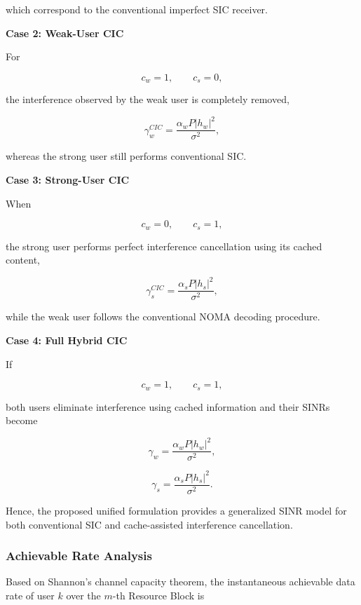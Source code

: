 \documentclass[12pt,a4paper]{article}
\begin{document}
which correspond to the conventional imperfect SIC receiver.

\textbf{Case 2: Weak-User CIC}

For

\[
c_w=1,\qquad c_s=0,
\]

the interference observed by the weak user is completely removed,

\begin{equation}
\gamma_w^{CIC}
=
\frac{\alpha_wP|h_w|^2}
{\sigma^2},
\end{equation}

whereas the strong user still performs conventional SIC.

\textbf{Case 3: Strong-User CIC}

When

\[
c_w=0,\qquad c_s=1,
\]

the strong user performs perfect interference cancellation using its cached content,

\begin{equation}
\gamma_s^{CIC}
=
\frac{\alpha_sP|h_s|^2}
{\sigma^2},
\end{equation}

while the weak user follows the conventional NOMA decoding procedure.

\textbf{Case 4: Full Hybrid CIC}

If

\[
c_w=1,\qquad c_s=1,
\]

both users eliminate interference using cached information and their SINRs become

\begin{equation}
\gamma_w
=
\frac{\alpha_wP|h_w|^2}
{\sigma^2},
\end{equation}

\begin{equation}
\gamma_s
=
\frac{\alpha_sP|h_s|^2}
{\sigma^2}.
\end{equation}

Hence, the proposed unified formulation provides a generalized SINR model for both conventional SIC and cache-assisted interference cancellation.

\subsubsection{Achievable Rate Analysis}

Based on Shannon's channel capacity theorem, the instantaneous achievable data rate of user $k$ over the $m$-th Resource Block is
\end{document}
